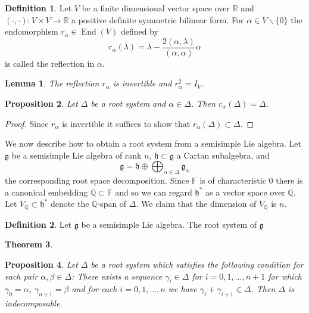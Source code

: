 \documentclass[12pt]{article}
\theoremstyle{plain}
\newtheorem{thm}{Theorem}[section]
\newtheorem{lemma}[thm]{Lemma}
\newtheorem{prop}[thm]{Proposition}
\theoremstyle{definition}
\newtheorem{defn}{Definition}[section]
\numberwithin{equation}{section}
\DeclareMathOperator{\en}{End}
\newcommand{\al}{\alpha}
\newcommand{\la}{\lambda}
\newcommand{\D}{\Delta}
\newcommand{\F}{\mathbb{F}}
\newcommand{\Q}{\mathbb{Q}}
\newcommand{\R}{\mathbb{R}}
\newcommand{\g}{\mathfrak{g}}
\newcommand{\h}{\mathfrak{h}}
\begin{document}
\begin{defn}
Let $V$ be a finite dimensional vector space over $\R$ and $(\cdot, \cdot) : V \times V \rightarrow \R$ a positive definite symmetric bilinear form. For $\al \in V \backslash \{0\}$ the endomorphism $r_\al \in \en(V)$ defined by
\[
r_\al(\la) = \la - \frac{2(\al, \la)}{(\al, \al)} \al
\]
is called the reflection in $\al$.
\end{defn}

\begin{lemma}
The reflection $r_\al$ is invertible and $r_\al^2 = I_V$.
\end{lemma}

\begin{prop}
Let $\D$ be a root system and $\al \in \D$. Then $r_\al(\D) = \D$.
\end{prop}

\begin{proof}
Since $r_\al$ is invertible it suffices to show that $r_\al(\D) \subset \D$.
\end{proof}



We now describe how to obtain a root system from a semisimple Lie algebra. Let $\g$ be a semisimple Lie algebra of rank $n$, $\h \subset \g$ a Cartan subalgebra, and
\[
\g = \h \oplus \bigoplus_{\al \in \D} \g_\al
\]
the corresponding root space decomposition. Since $\F$ is of characteristic $0$ there is a canonical embedding $\Q \subset \F$ and so we can regard $\h^*$ as a vector space over $\Q$. Let $V_\Q \subset \h^*$ denote the $\Q$-span of $\D$. We claim that the dimension of $V_\Q$ is $n$.

\begin{defn}
Let $\g$ be a semisimple Lie algebra. The root system of $\g$
\end{defn}


\begin{thm}

\end{thm}



\begin{prop}
Let $\D$ be a root system which satisfies the following condition for each pair $\al, \beta \in \D$: There exists a sequence $\gamma_i \in \D$ for $i = 0, 1, \ldots, n+1$ for which $\gamma_0 = \al$, $\gamma_{n+1} = \beta$ and for each $i = 0, 1, \ldots, n$ we have $\gamma_i + \gamma_{i+1} \in \D$. Then $\D$ is indecomposable.
\end{prop}
\end{document}
